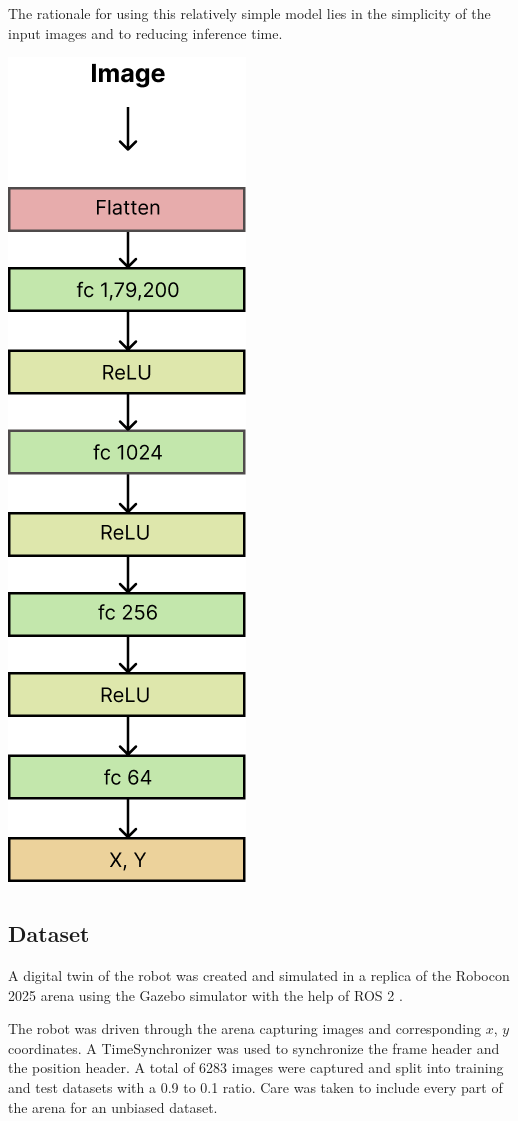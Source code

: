 \documentclass[a4paper]{article}
\begin{document}
\begin{multicols}{2}
\par \noindent
The rationale for using this relatively simple model lies in the simplicity of the input images 
and to reducing inference time.

{ \centering
 \includegraphics[width=0.2\columnwidth]{../results/model.png}\\
 \label{pinki}
}



\subsection{Dataset} 

\par \noindent
A digital twin of the robot was created and simulated in a replica of the Robocon 2025 arena 
using the Gazebo \cite{gazebo} simulator with the help of ROS 2 \cite{macenski2022ros2}. 

\par \noindent
The robot was driven through the arena capturing images and corresponding $x$, $y$ coordinates. A 
TimeSynchronizer was used to synchronize the frame header and the position header. A total of
6283 images were captured and split into training  and test datasets with a 0.9 to 0.1 ratio.
Care was taken to include every part of the arena for an unbiased dataset. 



\end{multicols}
\end{document}
